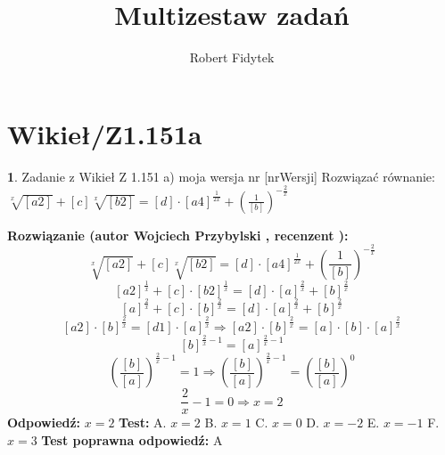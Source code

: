 \documentclass[12pt, a4paper]{article}
\title{Multizestaw zadań}
\author{Robert Fidytek}
\date{}
\theoremstyle{definition} %
\newtheorem{zad}{}
\newcommand{\kategoria}[1]{\section{#1}} %
\newcommand{\zadStart}[1]{\begin{zad}#1\newline} %
\newcommand{\zadStop}{\end{zad}}   %
\newcommand{\rozwStart}[2]{\noindent \textbf{Rozwiązanie (autor #1 , recenzent #2): }\newline} %
\newcommand{\rozwStop}{\newline}                                            %
\newcommand{\odpStart}{\noindent \textbf{Odpowiedź:}\newline}    %
\newcommand{\odpStop}{\newline}                                             %
\newcommand{\testStart}{\noindent \textbf{Test:}\newline} %
\newcommand{\testStop}{\newline} %
\newcommand{\kluczStart}{\noindent \textbf{Test poprawna odpowiedź:}\newline} %
\newcommand{\kluczStop}{\newline} %
\begin{document}
\maketitle


\kategoria{Wikieł/Z1.151a}
\zadStart{Zadanie z Wikieł Z 1.151 a) moja wersja nr [nrWersji]}
Rozwiązać równanie: $\sqrt[x]{[a2]}+[c]\sqrt[x]{[b2]}=[d]\cdot[a4]^{\frac{1}{2x}}+(\frac{1}{[b]})^{-\frac{2}{x}}$
\zadStop
\rozwStart{Wojciech Przybylski}{}
$$\sqrt[x]{[a2]}+[c]\sqrt[x]{[b2]}=[d]\cdot[a4]^{\frac{1}{2x}}+(\frac{1}{[b]})^{-\frac{2}{x}}$$
$${[a2]}^{\frac{1}{x}}+[c]\cdot{[b2]}^{\frac{1}{x}}=[d]\cdot[a]^{\frac{2}{x}}+[b]^{\frac{2}{x}}$$
$$[a]^{\frac{2}{x}}+[c]\cdot{[b]}^{\frac{2}{x}}=[d]\cdot[a]^{\frac{2}{x}}+[b]^{\frac{2}{x}}$$
$$[a2]\cdot{[b]}^{\frac{2}{x}}=[d1]\cdot[a]^{\frac{2}{x}}\Rightarrow[a2]\cdot{[b]}^{\frac{2}{x}}=[a]\cdot[b]\cdot[a]^{\frac{2}{x}}$$
$$[b]^{\frac{2}{x}-1}=[a]^{\frac{2}{x}-1}$$
$$(\frac{[b]}{[a]})^{\frac{2}{x}-1}=1 \Rightarrow (\frac{[b]}{[a]})^{\frac{2}{x}-1}=(\frac{[b]}{[a]})^{0}$$
$$\frac{2}{x}-1=0 \Rightarrow x=2$$
\rozwStop
\odpStart
$x=2$
\odpStop
\testStart
A. $x=2$
B. $x=1$
C. $x=0$
D. $x=-2$
E. $x=-1$
F. $x=3$
\testStop
\kluczStart
A
\kluczStop
\end{document}
